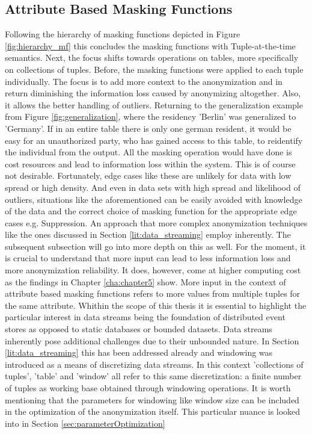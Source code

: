 \subsection{Attribute Based Masking Functions}
Following the hierarchy of masking functions depicted in Figure \ref{fig:hierarchy_mf} this concludes the masking functions with Tuple-at-the-time semantics. Next, the focus shifts towards operations on tables, more specifically on collections of tuples. Before, the masking functions were applied to each tuple individually. The focus is to add more context to the anonymization and in return diminishing the information loss caused by anonymizing altogether. Also, it allows the better handling of outliers. Returning to the generalization example from Figure \ref{fig:generalization}, where the residency 'Berlin' was generalized to 'Germany'. If in an entire table there is only one german resident, it would be easy for an unauthorized party, who has gained access to this table, to reidentify the individual from the output. All the masking operation would have done is cost resources and lead to information loss within the system. This is of course not desirable. Fortunately, edge cases like these are unlikely for data with low spread or high density. And even in data sets with high spread and likelihood of outliers, situations like the aforementioned can be easily avoided with knowledge of the data and the correct choice of masking function for the appropriate edge cases e.g. Suppression. An approach that more complex anonymization techniques like the ones discussed in Section \ref{lit:data_streaming} employ inherently. The subsequent subsection will go into more depth on this as well. For the moment, it is crucial to understand that more input can lead to less information loss and more anonymization reliability. It does, however, come at higher computing cost as the findings in Chapter \ref{cha:chapter5} show. More input in the context of attribute based masking functions refers to more values from multiple tuples for the same attribute. Whithin the scope of this thesis it is essential to highlight the particular interest in data streams being the foundation of distributed event stores as opposed to static databases or bounded datasets. Data streams inherently pose additional challenges due to their unbounded nature. In Section \ref{lit:data_streaming} this has been addressed already and windowing was introduced as a means of discretizing data streams. In this context 'collections of tuples', 'table' and 'window' all refer to this same discretization: a finite number of tuples as working base obtained through windowing operations. It is worth mentioning that the parameters for windowing like window size can be included in the optimization of the anonymization itself. This particular nuance is looked into in Section \ref{sec:parameterOptimization} \newline
